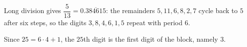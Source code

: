Long division gives $\dfrac{5}{13}=0.\overline{384615}$: the remainders $5,11,6,8,2,7$ cycle back to $5$ after six steps, so the digits $3,8,4,6,1,5$ repeat with period $6$.

Since $25=6\cdot4+1$, the $25$th digit is the first digit of the block, namely $\boxed{3}$.
